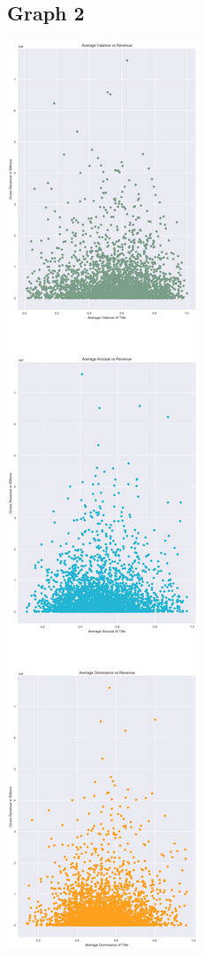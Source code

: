 \documentclass[10pt,a4paper]{article}
\begin{document}
\begin{appendices}
        \section{Graph 2}
        \includegraphics[scale=0.25]{vad_by_gross}
    \end{appendices}
\end{document}
